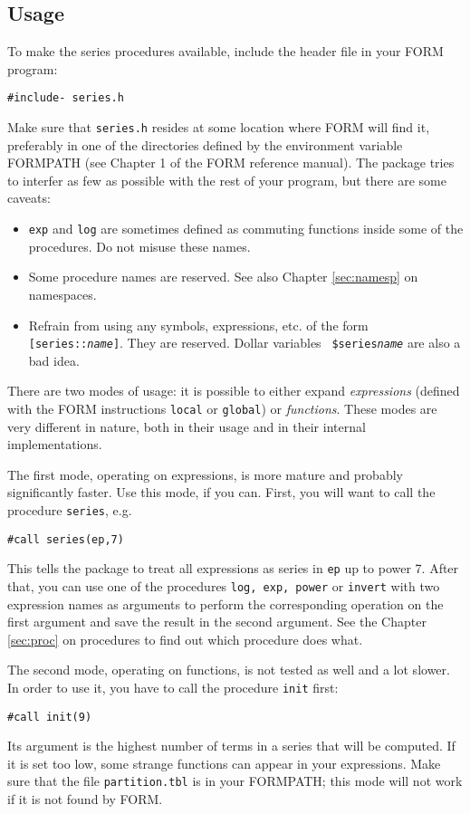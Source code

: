 \documentclass{article}
\begin{document}
\subsection{Usage}
\label{sec:usage}

To make the series procedures available, include the header file in your
FORM program:
\begin{verbatim}
#include- series.h
\end{verbatim}
Make sure that {\tt series.h} resides at some location where FORM will find
it, preferably in one of the directories defined by the environment
variable \mbox{FORMPATH} (see Chapter 1 of the FORM reference manual). The
package tries to interfer as few as possible with the rest of your
program, but there are some caveats:
\begin{itemize}
\item {\tt exp} and {\tt log} are sometimes defined as commuting
  functions inside some of the procedures. Do not misuse these names.
\item Some procedure names are reserved. See also Chapter
  \ref{sec:namesp} on namespaces.
\item Refrain from  using any symbols, expressions, etc. of the form
  {\tt[series::{\it name}]}. They are reserved. Dollar variables {\tt
    \$series{\it name}} are also a bad idea.
\end{itemize}

There are two modes of usage: it is possible to either expand {\em expressions}
(defined with the FORM instructions {\tt local} or {\tt global}) or {\em
  functions}. These modes are very different in nature, both in their
usage and in their internal implementations. 

The first mode, operating on expressions, is more mature and probably
significantly faster. Use this mode, if you can. First, you will want to
call the procedure {\tt series}, e.g.
\begin{verbatim}
#call series(ep,7)
\end{verbatim}
This tells the package to treat all expressions as series in {\tt ep} up
to power 7. After that, you can use one of the procedures {\tt log, exp,
  power} or {\tt invert} with two expression names as arguments to perform the
corresponding operation on the first argument and save the result in the
second argument. See the Chapter \ref{sec:proc} on procedures to find
out which procedure does what.

\medskip

The second mode, operating on functions, is not tested as well and
 a lot slower. In order to use it, you have to call the
procedure {\tt init} first:
\begin{verbatim}
#call init(9)
\end{verbatim}
Its argument is the highest number of terms in a series that will be
computed. If it is set too low, some strange functions can appear in
your expressions. Make sure that the file {\tt partition.tbl} is in your
FORMPATH; this mode will not work if it is not found by FORM.
\end{document}
